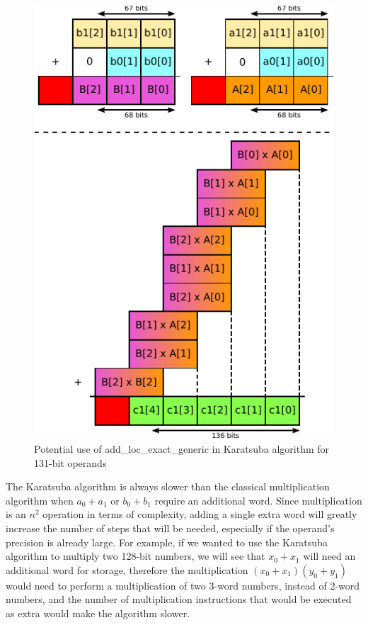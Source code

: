 \documentclass[12pt, a4paper]{report}
\begin{document}
\begin{figure}[h]
\centering
\includegraphics[scale=0.8]{figs/a0_plus_a1_karatsuba}
\caption{Potential use of add\_loc\_exact\_generic in Karatsuba algorithm for 131-bit operands}
\label{fig:a0_plus_a1_karatsuba}
\end{figure}

The Karatsuba algorithm is always slower than the classical multiplication algorithm
when $a_0 + a_1$ or $b_0 + b_1$ require an additional word.
Since multiplication is an $n^2$ operation in terms of complexity, adding a single
extra word will greatly increase the number of steps that will be needed, especially
if the operand's precision is already large.
For example, if we wanted to use the Karatsuba algorithm to multiply two 128-bit
numbers, we will see that $x_0 + x_1$ will need an additional word for storage,
therefore the multiplication $(x_0 + x_1) (y_0 + y_1)$ would need to perform a
multiplication of two 3-word numbers, instead of 2-word numbers, and the number
of multiplication instructions that would be executed as extra would make the
algorithm slower.
\end{document}
